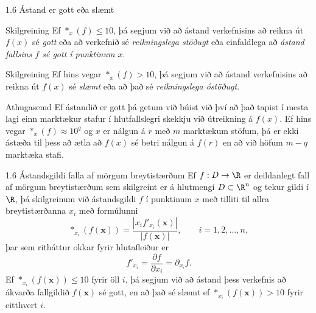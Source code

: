 %
\begin{frame}{1.6 Ástand er gott eða slæmt}

 \begin{block}{Skilgreining}
 Ef $\ast_x(f)\leq 10$, þá segjum við að ástand verkefnisins að reikna
 út $f(x)$ sé {\it gott} eða að verkefnið sé {\it reikningslega
   stöðugt} eða einfaldlega að {\it ástand fallsins $f$ sé gott í
   punktinum $x$}. 
\end{block}
\pause
\begin{block}{Skilgreining}
Ef hins vegar $\ast_x(f)>10$, þá segjum við að
 ástand verkefnisins að reikna út $f(x)$ sé {\it slæmt} eða að það sé
 {\it reikningslega óstöðugt}. 
\end{block}
\pause
\begin{block}{Athugasemd}
Ef ástandið er gott þá getum við búist
 við því að það tapist í mesta lagi einn marktækur stafur í
 hlutfallslegri skekkju við útreikning á $f(x)$. Ef hins vegar
 $\ast_x(f)\approx 10^q$ 
og $x$ er nálgun á $r$ með $m$ marktækum stöfum, þá er ekki ástæða til
þess að ætla að $f(x)$ sé betri nálgun á $f(r)$ en að við höfum $m-q$
marktæka stafi. 
\end{block}
\end{frame}

\begin{frame}{1.6 Ástandsgildi falla af mörgum breytistærðum} 
Ef $f: D\to \R$  er deildanlegt fall af mörgum breytistærðum sem
skilgreint er á hlutmengi $D\subset \R^n$ og tekur gildi í $\R$, þá
skilgreinum við ástandsgildi $f$ í punktinum $x$ með tilliti til allra
breytistærðanna $x_i$ með formúlunni 
\begin{equation*}
    \ast_{x_i}(f(\mathbf{x})) = 
    \dfrac{|x_i f'_{x_i}(\mathbf{x})|}{|f(\mathbf{x})|},
    \qquad i=1,2,\dots,n,
\end{equation*}
þar sem ritháttur okkar fyrir hlutafleiður er 
\begin{equation*}
    f'_{x_i} = 
    \dfrac{{\partial}f}{{\partial}x_i}={\partial}_{x_i}f.
\end{equation*}
Ef $\ast_{x_i}(f(\mathbf{x}))\leq 10$ fyrir öll $i$, þá segjum við að
ástand þess verkefnis að ákvarða fallgildið $f(\mathbf{x})$ sé gott,
en að það sé slæmt ef $\ast_{x_i}(f(\mathbf{x})) > 10$ fyrir eitthvert
$i$. 
\end{frame}
%

